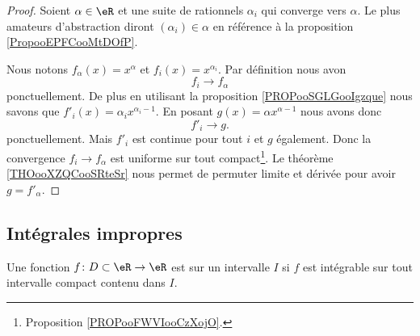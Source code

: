 \begin{proof}
	Soient \( \alpha\in \eR\) et une suite de rationnels \( \alpha_i\) qui converge vers \( \alpha\). Le plus amateurs d'abstraction diront \( (\alpha_i)\in \alpha\) en référence à la proposition \ref{PropooEPFCooMtDOfP}.

	Nous notons \( f_{\alpha}(x)=x^{\alpha}\) et \( f_i(x)=x^{\alpha_i}\). Par définition nous avon
	\begin{equation}
		f_i\to f_{\alpha}
	\end{equation}
	ponctuellement. De plus en utilisant la proposition \ref{PROPooSGLGooIgzque} nous savons que \( f'_i(x)=\alpha_i x^{\alpha_i-1}\). En posant \( g(x)=\alpha x^{\alpha-1}\) nous avons donc
	\begin{equation}
		f'_i\to g.
	\end{equation}
	ponctuellement. Mais \( f'_i\) est continue pour tout \( i\) et \( g\) également. Donc la convergence \( f_i\to f_{\alpha}\) est uniforme sur tout compact\footnote{Proposition \ref{PROPooFWVIooCzXojO}.}. Le théorème \ref{THOooXZQCooSRteSr} nous permet de permuter limite et dérivée pour avoir \( g=f'_{\alpha}\).
\end{proof}

\subsection{Intégrales impropres}
\label{SecGAVooBOQddU}


\begin{definition}
	Une fonction \( f\colon D\subset\eR\to \eR\) est  sur un intervalle \( I\) si \( f\) est intégrable sur tout intervalle compact contenu dans \( I\).
\end{definition}


